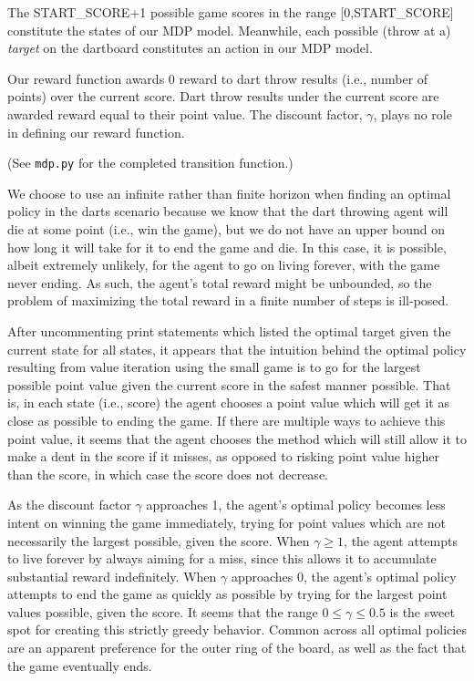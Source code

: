 \documentclass[solution, letterpaper]{cs121}
\begin{document}
\pagebreak


\subproblem{} %
The \textsc{START\_SCORE}+1 possible game scores in the range [0,\textsc{START\_SCORE}] constitute the states of our MDP model. Meanwhile, each possible (throw at a) \emph{target} on the dartboard constitutes an action in our MDP model.

\subproblem{} %
Our reward function awards 0 reward to dart throw results (i.e., number of points) over the current score. Dart throw results under the current score are awarded reward equal to their point value. The discount factor, $\gamma$, plays no role in defining our reward function.

\subproblem{} %
(See {\tt mdp.py} for the completed transition function.)

\subproblem{} %
We choose to use an infinite rather than finite horizon when finding an optimal policy in the darts scenario because we know that the dart throwing agent will die at some point (i.e., win the game), but we do not have an upper bound on how long it will take for it to end the game and die. In this case, it is possible, albeit extremely unlikely, for the agent to go on living forever, with the game never ending. As such, the agent's total reward might be unbounded, so the problem of maximizing the total reward in a finite number of steps is ill-posed.

\subproblem{} %
After uncommenting print statements which listed the optimal target given the current state for all states, it appears that the intuition behind the optimal policy resulting from value iteration using the small game is to go for the largest possible point value given the current score in the safest manner possible. That is, in each state (i.e., score) the agent chooses a point value which will get it as close as possible to ending the game. If there are multiple ways to achieve this point value, it seems that the agent chooses the method which will still allow it to make a dent in the score if it misses, as opposed to risking point value higher than the score, in which case the score does not decrease.

\subproblem{} %
As the discount factor $\gamma$ approaches 1, the agent's optimal policy becomes less intent on winning the game immediately, trying for point values which are not necessarily the largest possible, given the score. When $\gamma \geq 1$, the agent attempts to live forever by always aiming for a miss, since this allows it to accumulate substantial reward indefinitely. When $\gamma$ approaches 0, the agent's optimal policy attempts to end the game as quickly as possible by trying for the largest point values possible, given the score. It seems that the range $0 \leq \gamma \leq 0.5$ is the sweet
%  
spot for creating this strictly greedy behavior. Common across all optimal policies are an apparent preference for the outer ring of the board, as well as the fact that the game eventually ends.
\end{document}
